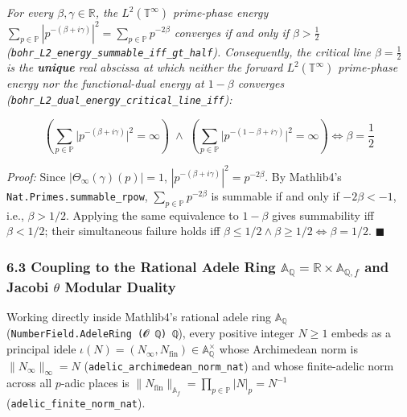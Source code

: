 \documentclass[
  11pt,
]{article}
\begin{document}
\emph{For every \(\beta, \gamma \in \mathbb{R}\), the
\(L^2(\mathbb{T}^\infty)\) prime-phase energy
\(\sum_{p \in \mathbb{P}} |p^{-(\beta + i\gamma)}|^2 = \sum_{p \in \mathbb{P}} p^{-2\beta}\)
converges if and only if \(\beta > \frac{1}{2}\)
(\texttt{bohr\_L2\_energy\_summable\_iff\_gt\_half}). Consequently, the
critical line \(\beta = \frac{1}{2}\) is the \textbf{unique} real
abscissa at which neither the forward \(L^2(\mathbb{T}^\infty)\)
prime-phase energy nor the functional-dual energy at \(1 - \beta\)
converges (\texttt{bohr\_L2\_dual\_energy\_critical\_line\_iff}):}

\[\left(\sum_{p \in \mathbb{P}} \big|p^{-(\beta + i\gamma)}\big|^2 = \infty\right) \;\land\; \left(\sum_{p \in \mathbb{P}} \big|p^{-(1-\beta + i\gamma)}\big|^2 = \infty\right) \iff \boxed{\beta = \frac{1}{2}}\]

\emph{Proof:} Since \(|\Theta_\infty(\gamma)(p)| = 1\),
\(|p^{-(\beta + i\gamma)}|^2 = p^{-2\beta}\). By Mathlib4's
\texttt{Nat.Primes.summable\_rpow},
\(\sum_{p \in \mathbb{P}} p^{-2\beta}\) is summable if and only if
\(-2\beta < -1\), i.e., \(\beta > 1/2\). Applying the same equivalence
to \(1 - \beta\) gives summability iff \(\beta < 1/2\); their
simultaneous failure holds iff
\(\beta \le 1/2 \land \beta \ge 1/2 \iff \beta = 1/2\). \(\blacksquare\)

\subsubsection{\texorpdfstring{6.3 Coupling to the Rational Adele Ring
\(\mathbb{A}_\mathbb{Q} = \mathbb{R} \times \mathbb{A}_{\mathbb{Q},f}\)
and Jacobi \(\theta\) Modular
Duality}{6.3 Coupling to the Rational Adele Ring \textbackslash mathbb\{A\}\_\textbackslash mathbb\{Q\} = \textbackslash mathbb\{R\} \textbackslash times \textbackslash mathbb\{A\}\_\{\textbackslash mathbb\{Q\},f\} and Jacobi \textbackslash theta Modular Duality}}\label{coupling-to-the-rational-adele-ring-mathbba_mathbbq-mathbbr-times-mathbba_mathbbqf-and-jacobi-theta-modular-duality}

Working directly inside Mathlib4's rational adele ring
\(\mathbb{A}_\mathbb{Q}\) (\texttt{NumberField.AdeleRing\ (𝓞\ ℚ)\ ℚ}),
every positive integer \(N \ge 1\) embeds as a principal idele
\(\iota(N) = (N_\infty, N_{\text{fin}}) \in \mathbb{A}_\mathbb{Q}^\times\)
whose Archimedean norm is \(\|N_\infty\|_\infty = N\)
(\texttt{adelic\_archimedean\_norm\_nat}) and whose finite-adelic norm
across all \(p\)-adic places is
\(\|N_{\text{fin}}\|_{\mathbb{A}_f} = \prod_{p \in \mathbb{P}} |N|_p = N^{-1}\)
(\texttt{adelic\_finite\_norm\_nat}).
\end{document}
